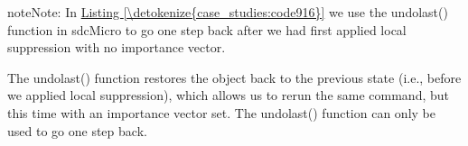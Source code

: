 \documentclass[letterpaper,10pt,english]{sphinxmanual}
\begin{document}
\begin{sphinxadmonition}{note}{Note:}
In \hyperref[\detokenize{case_studies:code916}]{Listing \ref{\detokenize{case_studies:code916}}} we use the undolast() function in sdcMicro to go one step back after we had first
applied local suppression with no importance vector.
\end{sphinxadmonition}

The undolast() function restores the  object back to the previous state
(i.e., before we applied local suppression), which allows us to rerun
the same command, but this time with an importance vector set. The
undolast() function can only be used to go one step back.

\def\sphinxLiteralBlockLabel{\label{\detokenize{case_studies:code916}}}
%
\end{document}
